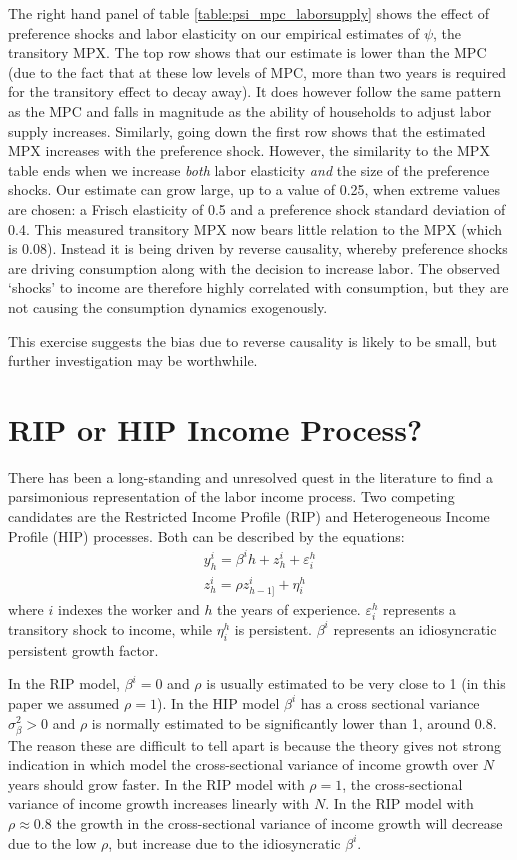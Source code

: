 \documentclass[titlepage]{\econtex}\newcommand{\texname}{ConsumptionHeterogeneity}
\begin{document}
The right hand panel of table \ref{table:psi_mpc_laborsupply} shows the effect of preference shocks and labor elasticity on our empirical estimates of $\psi$, the transitory MPX. The top row shows that our estimate is lower than the MPC (due to the fact that at these low levels of MPC, more than two years is required for the transitory effect to decay away). It does however follow the same pattern as the MPC and falls in magnitude as the ability of households to adjust labor supply increases. Similarly, going down the first row shows that the estimated MPX increases with the preference shock. However, the similarity to the MPX table ends when we increase \textit{both} labor elasticity \textit{and} the size of the preference shocks. Our estimate can grow large, up to a value of 0.25, when extreme values are chosen: a Frisch elasticity of 0.5 and a preference shock standard deviation of 0.4. This measured transitory MPX now bears little relation to the MPX (which is 0.08). Instead it is being driven by reverse causality, whereby preference shocks are driving consumption along with the decision to increase labor. The observed `shocks' to income are therefore highly correlated with consumption, but they are not causing the consumption dynamics exogenously.

This exercise suggests the bias due to reverse causality is likely to be small, but further investigation may be worthwhile.

\section{RIP or HIP Income Process?} \label{rip_hip_appendix}
\setcounter{figure}{0}   
\setcounter{table}{0} 
There has been a long-standing and unresolved quest in the literature to find a parsimonious representation of the labor income process. Two competing candidates are the Restricted Income Profile (RIP) and Heterogeneous Income Profile (HIP) processes. Both can be described by the equations:
\begin{align*}
	y_h^i = \beta^i h + z^i_h + \varepsilon^h_i\\
	z^i_h = \rho z^i_{h-1]} + \eta^h_i
\end{align*}
where $i$ indexes the worker and $h$ the years of experience. $\varepsilon^h_i$ represents a transitory shock to income, while $\eta^h_i$ is persistent. $\beta^i$ represents an idiosyncratic persistent growth factor.

In the RIP model, $\beta^i=0$ and $\rho$ is usually estimated to be very close to 1 (in this paper we assumed $\rho=1$). In the HIP model $\beta^i$ has a cross sectional variance $\sigma_{\beta}^2>0$ and $\rho$ is normally estimated to be significantly lower than 1, around 0.8. The reason these are difficult to tell apart is because the theory gives not strong indication in which model the cross-sectional variance of income growth over $N$ years should grow faster. In the RIP model with $\rho=1$, the cross-sectional variance of income growth increases linearly with $N$. In the RIP model with $\rho\approx 0.8$ the growth in the  cross-sectional variance of income growth will decrease due to the low $\rho$, but increase due to the idiosyncratic $\beta^i$.
\end{document}
